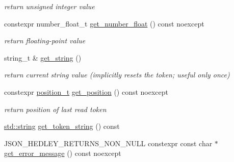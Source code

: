 \begin{DoxyCompactItemize}
\begin{DoxyCompactList}\small\item\em return unsigned integer value \end{DoxyCompactList}\item 
\mbox{\label{classnlohmann_1_1detail_1_1lexer_adb1a71f6a3e65ed32c452a318967b61e}} 
constexpr number\+\_\+float\+\_\+t \hyperlink{classnlohmann_1_1detail_1_1lexer_adb1a71f6a3e65ed32c452a318967b61e}{get\+\_\+number\+\_\+float} () const noexcept
\begin{DoxyCompactList}\small\item\em return floating-\/point value \end{DoxyCompactList}\item 
\mbox{\label{classnlohmann_1_1detail_1_1lexer_a76875bb49a480763f6c48b8586f7e60e}} 
string\+\_\+t \& \hyperlink{classnlohmann_1_1detail_1_1lexer_a76875bb49a480763f6c48b8586f7e60e}{get\+\_\+string} ()
\begin{DoxyCompactList}\small\item\em return current string value (implicitly resets the token; useful only once) \end{DoxyCompactList}\item 
\mbox{\label{classnlohmann_1_1detail_1_1lexer_a948c80b8bd8a3095b544e4655e1ca37e}} 
constexpr \hyperlink{structnlohmann_1_1detail_1_1position__t}{position\+\_\+t} \hyperlink{classnlohmann_1_1detail_1_1lexer_a948c80b8bd8a3095b544e4655e1ca37e}{get\+\_\+position} () const noexcept
\begin{DoxyCompactList}\small\item\em return position of last read token \end{DoxyCompactList}\item 
\hyperlink{namespacenlohmann_1_1detail_a1ed8fc6239da25abcaf681d30ace4985ab45cffe084dd3d20d928bee85e7b0f21}{std\+::string} \hyperlink{classnlohmann_1_1detail_1_1lexer_ae000b7571480e528dee4b281f63d5b15}{get\+\_\+token\+\_\+string} () const
\item 
\mbox{\label{classnlohmann_1_1detail_1_1lexer_a9da0c649f03e8b3f730501d26c876a78}} 
J\+S\+O\+N\+\_\+\+H\+E\+D\+L\+E\+Y\+\_\+\+R\+E\+T\+U\+R\+N\+S\+\_\+\+N\+O\+N\+\_\+\+N\+U\+LL constexpr const char $\ast$ \hyperlink{classnlohmann_1_1detail_1_1lexer_a9da0c649f03e8b3f730501d26c876a78}{get\+\_\+error\+\_\+message} () const noexcept

\end{DoxyCompactItemize}
